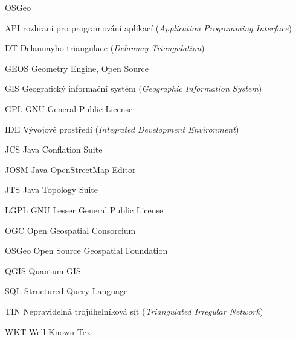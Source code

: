

\begin{seznamzkratek}{OSGeo}

		{API}
		{rozhraní pro programování aplikací (\textit{Application Programming Interface})}

		{DT}
		{Delaunayho triangulace  (\textit{Delaunay Triangulation})}

	      {GEOS}
	      {Geometry Engine, Open Source}

	      {GIS}
 	      {Geografický informační systém  (\textit{Geographic Information System})}

	      {GPL}
	      {GNU General Public License}

	      {IDE}
 	      {Vývojové prostředí (\textit{Integrated Development Environment})}

	      {JCS}
 	      {Java Conflation Suite}

	      {JOSM}
	      {Java OpenStreetMap Editor}

	      {JTS}
	      {Java Topology Suite}

	      {LGPL}
	      {GNU Lesser General Public License}

	      {OGC}
	      {Open Geospatial Consorcium}

	      {OSGeo}
	      {Open Source Geospatial Foundation}

	      {QGIS}
 	      {Quantum GIS}

	      {SQL}
	      {Structured Query Language}

	      {TIN}
 	      {Nepravidelná trojúhelníková síť  (\textit{Triangulated Irregular Network})}

	      {WKT}
 	      {Well Known Tex} %

\end{seznamzkratek}